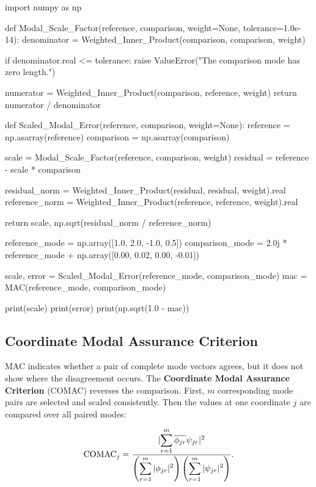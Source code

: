 \begin{python}
import numpy as np


def Modal_Scale_Factor(reference, comparison, weight=None,
                       tolerance=1.0e-14):
    denominator = Weighted_Inner_Product(comparison, comparison, weight)

    if denominator.real <= tolerance:
        raise ValueError("The comparison mode has zero length.")

    numerator = Weighted_Inner_Product(comparison, reference, weight)
    return numerator / denominator


def Scaled_Modal_Error(reference, comparison, weight=None):
    reference = np.asarray(reference)
    comparison = np.asarray(comparison)

    scale = Modal_Scale_Factor(reference, comparison, weight)
    residual = reference - scale * comparison

    residual_norm = Weighted_Inner_Product(residual, residual, weight).real
    reference_norm = Weighted_Inner_Product(reference, reference, weight).real

    return scale, np.sqrt(residual_norm / reference_norm)


reference_mode = np.array([1.0, 2.0, -1.0, 0.5])
comparison_mode = 2.0j * reference_mode + np.array([0.00, 0.02, 0.00, -0.01])

scale, error = Scaled_Modal_Error(reference_mode, comparison_mode)
mac = MAC(reference_mode, comparison_mode)

print(scale)
print(error)
print(np.sqrt(1.0 - mac))
\end{python}

\subsection{Coordinate Modal Assurance Criterion}

MAC indicates whether a pair of complete mode vectors agrees, but it does not
show where the disagreement occurs. The \textbf{Coordinate Modal Assurance
Criterion} (COMAC) reverses the comparison. First, $m$ corresponding mode pairs
are selected and scaled consistently. Then the values at one coordinate $j$ are
compared over all paired modes:

\begin{bbox}
    \begin{equation}\label{comac-definition}
        \operatorname{COMAC}_j=
        \frac{
            | {\displaystyle\sum_{r=1}^{m}
                \overline{\phi_{jr}}\psi_{jr}} |^2
        }{
            \left(\displaystyle\sum_{r=1}^{m}| {\phi_{jr}} |^2\right)
            \left(\displaystyle\sum_{r=1}^{m}| {\psi_{jr}} |^2\right)
        }.
    \end{equation}
\end{bbox}


